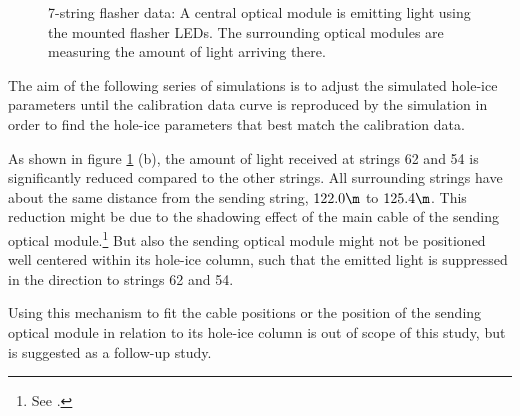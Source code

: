\begin{figure}[htbp]
  \hfill
  \caption{7-string flasher data: A central optical module is emitting light using the mounted flasher LEDs. The surrounding optical modules are measuring the amount of light arriving there.}
  \label{fig:ea9Zieh0}
\end{figure}

The aim of the following series of simulations is to adjust the simulated hole-ice parameters until the calibration data curve is reproduced by the simulation in order to find the hole-ice parameters that best match the calibration data.



As shown in figure \ref{fig:ea9Zieh0} (b), the amount of light received at strings 62 and 54 is significantly reduced compared to the other strings. All surrounding strings have about the same distance from the sending string, $122.0\m$ to $125.4\m$. This reduction might be due to the shadowing effect of the main cable of the sending optical module.\footnote{See .} But also the sending optical module might not be positioned well centered within its hole-ice column, such that the emitted light is suppressed in the direction to strings 62 and 54.

Using this mechanism to fit the cable positions or the position of the sending optical module in relation to its hole-ice column is out of scope of this study, but is suggested as a follow-up study.\followup

